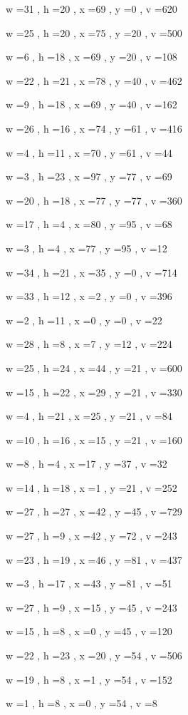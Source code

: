 \documentclass[11pt]{article}
\begin{document}
w =31 , h =20 , x =69 , y =0 , v =620
\par
w =25 , h =20 , x =75 , y =20 , v =500
\par
w =6 , h =18 , x =69 , y =20 , v =108
\par
w =22 , h =21 , x =78 , y =40 , v =462
\par
w =9 , h =18 , x =69 , y =40 , v =162
\par
w =26 , h =16 , x =74 , y =61 , v =416
\par
w =4 , h =11 , x =70 , y =61 , v =44
\par
w =3 , h =23 , x =97 , y =77 , v =69
\par
w =20 , h =18 , x =77 , y =77 , v =360
\par
w =17 , h =4 , x =80 , y =95 , v =68
\par
w =3 , h =4 , x =77 , y =95 , v =12
\par
w =34 , h =21 , x =35 , y =0 , v =714
\par
w =33 , h =12 , x =2 , y =0 , v =396
\par
w =2 , h =11 , x =0 , y =0 , v =22
\par
w =28 , h =8 , x =7 , y =12 , v =224
\par
w =25 , h =24 , x =44 , y =21 , v =600
\par
w =15 , h =22 , x =29 , y =21 , v =330
\par
w =4 , h =21 , x =25 , y =21 , v =84
\par
w =10 , h =16 , x =15 , y =21 , v =160
\par
w =8 , h =4 , x =17 , y =37 , v =32
\par
w =14 , h =18 , x =1 , y =21 , v =252
\par
w =27 , h =27 , x =42 , y =45 , v =729
\par
w =27 , h =9 , x =42 , y =72 , v =243
\par
w =23 , h =19 , x =46 , y =81 , v =437
\par
w =3 , h =17 , x =43 , y =81 , v =51
\par
w =27 , h =9 , x =15 , y =45 , v =243
\par
w =15 , h =8 , x =0 , y =45 , v =120
\par
w =22 , h =23 , x =20 , y =54 , v =506
\par
w =19 , h =8 , x =1 , y =54 , v =152
\par
w =1 , h =8 , x =0 , y =54 , v =8
\par
\newpage
\end{document}
